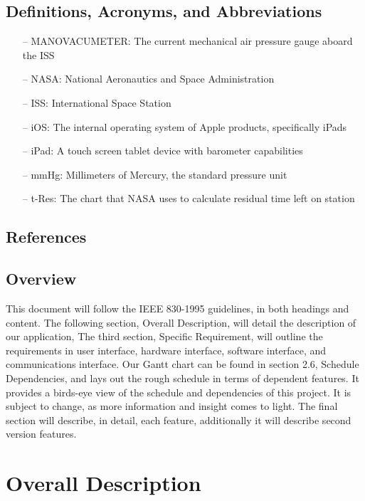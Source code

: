 \documentclass[onecolumn, draftclsnofoot,10pt, compsoc]{IEEEtran}
\begin{document}
\subsection{Definitions, Acronyms, and Abbreviations}
\begin{itemize}
\item[--] MANOVACUMETER: The current mechanical air pressure gauge aboard the ISS
\item[--] NASA: National Aeronautics and Space Administration
\item[--] ISS: International Space Station
\item[--] iOS: The internal operating system of Apple products, specifically iPads
\item[--] iPad: A touch screen tablet device with barometer capabilities
\item[--] mmHg: Millimeters of Mercury, the standard pressure unit
\item[--] t-Res: The chart that NASA uses to calculate residual time left on station
\end{itemize}

\subsection{References}

\subsection{Overview}
This document will follow the IEEE 830-1995 guidelines, in both headings and content.
The following section, Overall Description, will detail the description of our application,
The third section, Specific Requirement, will outline the requirements in user interface, hardware interface, software interface, and communications interface.
Our Gantt chart can be found in section 2.6, Schedule Dependencies, and lays out the rough schedule in terms of dependent features.
It provides a birds-eye view of the schedule and dependencies of this project.
It is subject to change, as more information and insight comes to light.
The final section will describe, in detail, each feature, additionally it will describe second version features.


\section{Overall Description}
\end{document}
